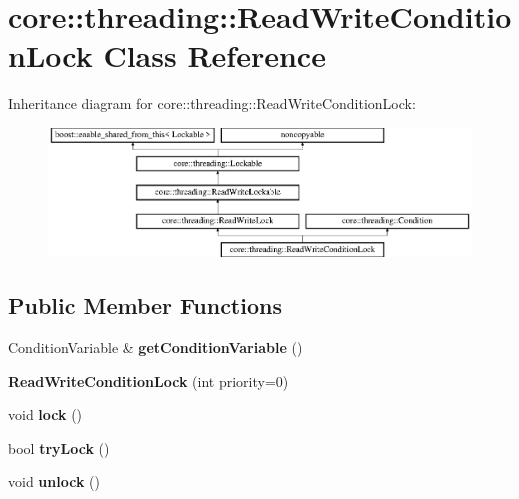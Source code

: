 \hypertarget{classcore_1_1threading_1_1_read_write_condition_lock}{\section{core\-:\-:threading\-:\-:Read\-Write\-Condition\-Lock Class Reference}
\label{classcore_1_1threading_1_1_read_write_condition_lock}
}
Inheritance diagram for core\-:\-:threading\-:\-:Read\-Write\-Condition\-Lock\-:\begin{figure}[H]
\begin{center}
\leavevmode
\includegraphics[height=3.418803cm]{classcore_1_1threading_1_1_read_write_condition_lock}
\end{center}
\end{figure}
\subsection*{Public Member Functions}
\begin{DoxyCompactItemize}
\item 
\hypertarget{classcore_1_1threading_1_1_read_write_condition_lock_ac7579134cfc7b482093db29b5db9aae7}{Condition\-Variable \& {\bfseries get\-Condition\-Variable} ()}\label{classcore_1_1threading_1_1_read_write_condition_lock_ac7579134cfc7b482093db29b5db9aae7}

\item 
\hypertarget{classcore_1_1threading_1_1_read_write_condition_lock_a50032967c9768caa236434afa88171d7}{{\bfseries Read\-Write\-Condition\-Lock} (int priority=0)}\label{classcore_1_1threading_1_1_read_write_condition_lock_a50032967c9768caa236434afa88171d7}

\item 
\hypertarget{classcore_1_1threading_1_1_read_write_condition_lock_a361c2ed248527f9c4880922dd40c19dd}{void {\bfseries lock} ()}\label{classcore_1_1threading_1_1_read_write_condition_lock_a361c2ed248527f9c4880922dd40c19dd}

\item 
\hypertarget{classcore_1_1threading_1_1_read_write_condition_lock_a0aabfaf29175ee9e25d3b0ff7e3b4d18}{bool {\bfseries try\-Lock} ()}\label{classcore_1_1threading_1_1_read_write_condition_lock_a0aabfaf29175ee9e25d3b0ff7e3b4d18}

\item 
\hypertarget{classcore_1_1threading_1_1_read_write_condition_lock_a325f8d1e24627ba2512ec34f439d61f8}{void {\bfseries unlock} ()}\label{classcore_1_1threading_1_1_read_write_condition_lock_a325f8d1e24627ba2512ec34f439d61f8}

\end{DoxyCompactItemize}
